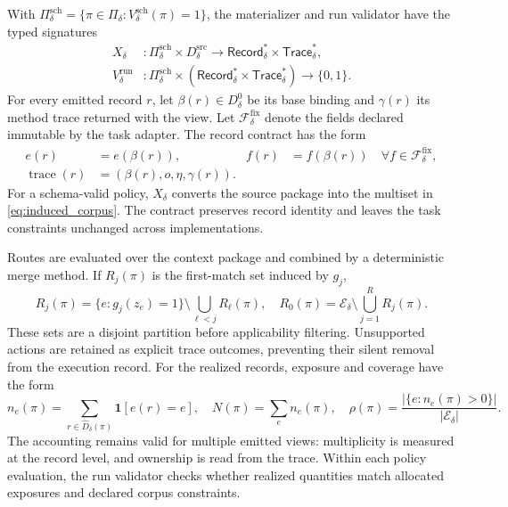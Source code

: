 With $\Pi_{\delta}^{\mathrm{sch}}=\{\pi\in\Pi_{\delta}:V_{\delta}^{\mathrm{sch}}(\pi)=1\}$, the materializer and run validator have the typed signatures
\begin{equation}
 \begin{aligned}
 X_{\delta}&:
 \Pi_{\delta}^{\mathrm{sch}}\times D_{\delta}^{\mathrm{src}}
 \longrightarrow
 \mathsf{Record}_{\delta}^{*}\times\mathsf{Trace}_{\delta}^{*},\\
 V_{\delta}^{\mathrm{run}}&:
 \Pi_{\delta}^{\mathrm{sch}}\times
 \left(\mathsf{Record}_{\delta}^{*}\times\mathsf{Trace}_{\delta}^{*}\right)
 \longrightarrow\{0,1\}.
 \end{aligned}
 \label{eq:materializer_interface}
\end{equation}
For every emitted record $r$, let $\beta(r)\in D^0_{\delta}$ be its base binding and $\gamma(r)$ its method trace returned with the view.
Let $\mathcal{F}_{\delta}^{\mathrm{fix}}$ denote the fields declared immutable by the task adapter.
The record contract has the form
\begin{equation}
 \begin{aligned}
 e(r)&=e(\beta(r)),&
 f(r)&=f(\beta(r))\quad\forall f\in\mathcal{F}_{\delta}^{\mathrm{fix}},\\
 \operatorname{trace}(r)&=(\beta(r),o,\eta,\gamma(r)).
 \end{aligned}
 \label{eq:record_contract}
\end{equation}
For a schema-valid policy, $X_{\delta}$ converts the source package into the multiset in \eqref{eq:induced_corpus}.
The contract preserves record identity and leaves the task constraints unchanged across implementations.

Routes are evaluated over the context package and combined by a deterministic merge method.
If $R_j(\pi)$ is the first-match set induced by $g_j$,
\begin{equation}
 \displaystyle
 R_j(\pi)=\{e:g_j(z_e)=1\}\setminus\bigcup_{\ell<j}R_\ell(\pi),
 \quad
 R_0(\pi)=\mathcal{E}_{\delta}\setminus\bigcup_{j=1}^{R}R_j(\pi).
 \label{eq:abstract_routes}
\end{equation}
These sets are a disjoint partition before applicability filtering.
Unsupported actions are retained as explicit trace outcomes, preventing their silent removal from the execution record.
For the realized records, exposure and coverage have the form
\begin{equation}
 \displaystyle
 n_e(\pi)=\sum_{r\in\widehat D_{\delta}(\pi)}\mathbf{1}[e(r)=e],
 \quad
  N(\pi)=\sum_{e}n_e(\pi),
 \quad
 \rho(\pi)=\frac{|\{e:n_e(\pi)>0\}|}{|\mathcal{E}_{\delta}|}.
 \label{eq:abstract_accounting}
\end{equation}
The accounting remains valid for multiple emitted views: multiplicity is measured at the record level, and ownership is read from the trace.
Within each policy evaluation, the run validator checks whether realized quantities match allocated exposures and declared corpus constraints.

